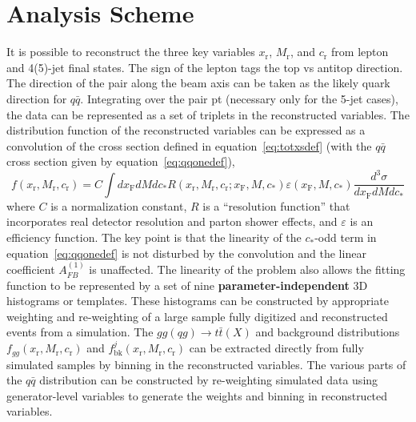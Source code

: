\documentclass{cmspaperpdf}
\begin{document}
\section{Analysis Scheme}
\label{sec:analysis scheme}
It is possible to reconstruct the three key variables $x_\mathrm{r}$, $M_\mathrm{r}$, and $c_\mathrm{r}$ from lepton and 4(5)-jet final states.  The sign of the lepton tags the top vs antitop direction.  The direction of the pair along the beam axis can be taken as the likely quark direction for $q\bar q$.  Integrating over the pair pt (necessary only for the 5-jet cases), the data can be represented as a set of triplets in the reconstructed variables.  The distribution function of the reconstructed variables can be expressed as a convolution of the cross section defined in equation~\ref{eq:totxsdef} (with the $q\bar q$ cross section given by equation~\ref{eq:qqonedef}),
\begin{equation}
f(x_\mathrm{r},M_\mathrm{r},c_\mathrm{r}) = C \int dx_\mathrm{F}dMdc_* R(x_\mathrm{r},M_\mathrm{r},c_\mathrm{r}; x_\mathrm{F}, M, c_*)\varepsilon (x_\mathrm{F}, M, c_*) \frac{d^3\sigma}{dx_\mathrm{F}dM dc_*} 
\end{equation}
where $C$ is a normalization constant, $R$ is a ``resolution function'' that incorporates real detector resolution and parton shower effects, and $\varepsilon$ is an efficiency function.  The key point is that the linearity of the $c_*$-odd term in equation~\ref{eq:qqonedef} is not disturbed by the convolution and the linear coefficient $A_{FB}^{(1)}$ is unaffected.  The linearity of the problem also allows the fitting function to be represented by a set of nine {\bf parameter-independent} 3D histograms or templates.  These histograms can be constructed by appropriate weighting and re-weighting of a large sample fully digitized and reconstructed events from a simulation.  The $gg(qg)\to t\bar t(X)$ and background distributions $f_{gg}(x_\mathrm{r},M_\mathrm{r},c_\mathrm{r})$ and $f^j_\mathrm{bk}(x_\mathrm{r},M_\mathrm{r},c_\mathrm{r})$ can be extracted directly from fully simulated samples by binning in the reconstructed variables.  The various parts of the $q\bar q$ distribution can be constructed by re-weighting simulated data using generator-level variables to generate the weights and binning in reconstructed variables. 
\end{document}
